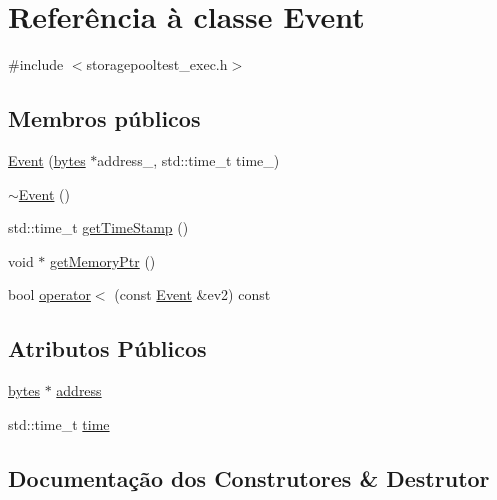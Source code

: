 \hypertarget{classEvent}{}\section{Referência à classe Event}
\label{classEvent}


{\ttfamily \#include $<$storagepooltest\+\_\+exec.\+h$>$}

\subsection*{Membros públicos}
\begin{DoxyCompactItemize}
\item 
\hyperlink{classEvent_ae4b2efb597b48fb229222bd8fd5630ac}{Event} (\hyperlink{storagepooltest__exec_8h_a9192c6634956b334d70312524e15a909}{bytes} $\ast$address\+\_\+, std\+::time\+\_\+t time\+\_\+)
\item 
\hyperlink{classEvent_a7704ec01ce91e673885792054214b3d2}{$\sim$\+Event} ()
\item 
std\+::time\+\_\+t \hyperlink{classEvent_a10f30e1a322839fe772a6533d8681c4f}{get\+Time\+Stamp} ()
\item 
void $\ast$ \hyperlink{classEvent_ad251fb8313c6697932445d151c0fa0e2}{get\+Memory\+Ptr} ()
\item 
bool \hyperlink{classEvent_adc997c0b38105e44e659bcd339699bd8}{operator$<$} (const \hyperlink{classEvent}{Event} \&ev2) const
\end{DoxyCompactItemize}
\subsection*{Atributos Públicos}
\begin{DoxyCompactItemize}
\item 
\hyperlink{storagepooltest__exec_8h_a9192c6634956b334d70312524e15a909}{bytes} $\ast$ \hyperlink{classEvent_ab97f39d1ca773c8756d319bf8acad6f4}{address}
\item 
std\+::time\+\_\+t \hyperlink{classEvent_a3f96ab977c7b3b16edf59e8f96193ac0}{time}
\end{DoxyCompactItemize}


\subsection{Documentação dos Construtores \& Destrutor}
\mbox{\label{classEvent_ae4b2efb597b48fb229222bd8fd5630ac}} 
